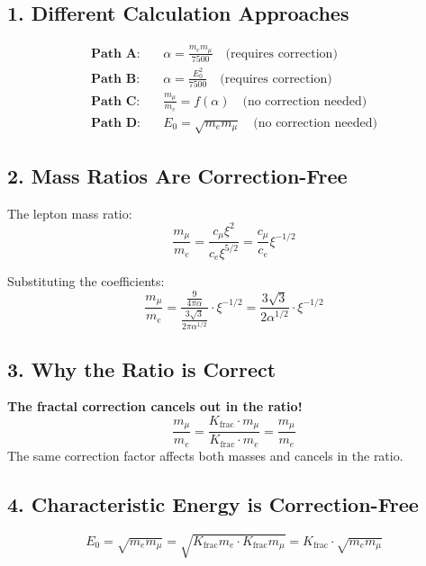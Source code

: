 \documentclass[12pt,a4paper]{article}
\begin{document}
	\subsection*{1. Different Calculation Approaches}
	
	\begin{align*}
		\textbf{Path A:} &\quad \alpha = \frac{m_e m_\mu}{7500} \quad \text{(requires correction)} \\
		\textbf{Path B:} &\quad \alpha = \frac{E_0^2}{7500} \quad \text{(requires correction)} \\
		\textbf{Path C:} &\quad \frac{m_\mu}{m_e} = f(\alpha) \quad \text{(no correction needed)} \\
		\textbf{Path D:} &\quad E_0 = \sqrt{m_e m_\mu} \quad \text{(no correction needed)}
	\end{align*}
	
	\subsection*{2. Mass Ratios Are Correction-Free}
	
	The lepton mass ratio:
	\[
	\frac{m_\mu}{m_e} = \frac{c_\mu \xi^2}{c_e \xi^{5/2}} = \frac{c_\mu}{c_e} \xi^{-1/2}
	\]
	
	Substituting the coefficients:
	\[
	\frac{m_\mu}{m_e} = \frac{\frac{9}{4\pi\alpha}}{\frac{3\sqrt{3}}{2\pi\alpha^{1/2}}} \cdot \xi^{-1/2} = \frac{3\sqrt{3}}{2\alpha^{1/2}} \cdot \xi^{-1/2}
	\]
	
	\subsection*{3. Why the Ratio is Correct}
	
	\begin{tcolorbox}[colback=green!5!white,colframe=green!75!black]
		\textbf{The fractal correction cancels out in the ratio!}
		\[
		\frac{m_\mu}{m_e} = \frac{K_{\text{frac}} \cdot m_\mu}{K_{\text{frac}} \cdot m_e} = \frac{m_\mu}{m_e}
		\]
		The same correction factor affects both masses and cancels in the ratio.
	\end{tcolorbox}
	
	\subsection*{4. Characteristic Energy is Correction-Free}
	
	\[
	E_0 = \sqrt{m_e m_\mu} = \sqrt{K_{\text{frac}} m_e \cdot K_{\text{frac}} m_\mu} = K_{\text{frac}} \cdot \sqrt{m_e m_\mu}
	\]
	
\end{document}
